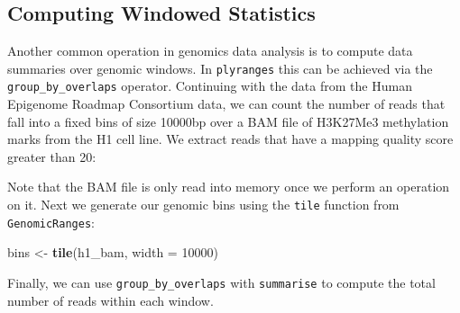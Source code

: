 \documentclass[10pt,letterpaper]{article}
\newenvironment{Shaded}{\begin{snugshade}}{\end{snugshade}}
\newcommand{\KeywordTok}[1]{\textcolor[rgb]{0.13,0.29,0.53}{\textbf{#1}}}
\newcommand{\DataTypeTok}[1]{\textcolor[rgb]{0.13,0.29,0.53}{#1}}
\newcommand{\DecValTok}[1]{\textcolor[rgb]{0.00,0.00,0.81}{#1}}
\newcommand{\StringTok}[1]{\textcolor[rgb]{0.31,0.60,0.02}{#1}}
\newcommand{\OperatorTok}[1]{\textcolor[rgb]{0.81,0.36,0.00}{\textbf{#1}}}
\newcommand{\NormalTok}[1]{#1}
\begin{document}
\subsection{Computing Windowed
Statistics}\label{computing-windowed-statistics}

Another common operation in genomics data analysis is to compute data
summaries over genomic windows. In \texttt{plyranges} this can be
achieved via the \texttt{group\_by\_overlaps} operator. Continuing with
the data from the Human Epigenome Roadmap Consortium data, we can count
the number of reads that fall into a fixed bins of size 10000bp over a
BAM file of H3K27Me3 methylation marks from the H1 cell line. We extract
reads that have a mapping quality score greater than 20:

\begin{Shaded}
\end{Shaded}

Note that the BAM file is only read into memory once we perform an
operation on it. Next we generate our genomic bins using the
\texttt{tile} function from \texttt{GenomicRanges}:

\begin{Shaded}
\begin{Highlighting}[]
\NormalTok{bins <-}\StringTok{ }\KeywordTok{tile}\NormalTok{(h1_bam, }\DataTypeTok{width =} \DecValTok{10000}\NormalTok{)}
\end{Highlighting}
\end{Shaded}

Finally, we can use \texttt{group\_by\_overlaps} with \texttt{summarise}
to compute the total number of reads within each window.

\begin{Shaded}
\end{Shaded}
\end{document}
